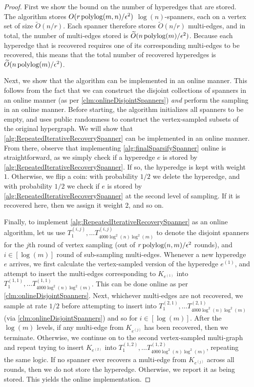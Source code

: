 \documentclass{article}
\begin{document}
\begin{proof}
    First we show the bound on the number of hyperedges that are stored. The algorithm stores $O(r \operatorname{polylog}(m,n) / \epsilon^2)$ $\log(n)$-spanners, each on a vertex set of size $\widetilde{O}(n/r)$. Each spanner therefore stores $\widetilde{O}(n/r)$ multi-edges, and in total, the number of multi-edges stored is $\widetilde{O}(n \operatorname{polylog}(m) / \epsilon^2)$. Because each hyperedge that is recovered requires one of its corresponding multi-edges to be recovered, this means that the total number of recovered hyperedges is $\widetilde{O}(n \operatorname{polylog}(m) / \epsilon^2)$.

    Next, we show that the algorithm can be implemented in an online manner. This follows from the fact that we can construct the disjoint collections of spanners in an online manner (as per \cref{clm:onlineDisjointSpanners}) \emph{and} perform the sampling in an online manner. Before starting, the algorithm initializes all spanners to be empty, and uses public randomness to construct the vertex-sampled subsets of the original hypergraph. We will show that \cref{alg:RepeatedIterativeRecoverySpanner} can be implemented in an online manner. From there, observe that implementing \cref{alg:finalSparsifySpanner} online is straightforward, as we simply check if a hyperedge $e$ is stored by \cref{alg:RepeatedIterativeRecoverySpanner}. If so, the hyperedge is kept with weight $1$. Otherwise, we flip a coin: with probability $1/2$ we delete the hyperedge, and with probability $1/2$ we check if $e$ is stored by \cref{alg:RepeatedIterativeRecoverySpanner} at the second level of sampling. If it is recovered here, then we assign it weight $2$, and so on. 

    Finally, to implement \cref{alg:RepeatedIterativeRecoverySpanner} as an online algorithm, let us use $T^{(i,j)}_1, \dots T^{(i,j)}_{4000 \log^2(n)\log^2(m)}$ to denote the disjoint spanners for the $j$th round of vertex sampling (out of $r \operatorname{polylog}(n,m)/ \epsilon^2$ rounds), and $i \in [\log(m)]$ round of sub-sampling multi-edges. Whenever a new hyperedge $e$ arrives, we first calculate the vertex-sampled version of the hyperedge $e^{(1)}$, and attempt to insert the multi-edges corresponding to $K_{e^{(1)}}$ into $T^{(1,1)}_1, \dots T^{(1,1)}_{4000 \log^2(n)\log^2(m)}$. This can be done online as per \cref{clm:onlineDisjointSpanners}. Next, whichever multi-edges are not recovered, we sample at rate $1/2$ before attempting to insert into $T^{(2,1)}_1, \dots T^{(2,1)}_{4000 \log^2(n)\log^2(m)}$ (via \cref{clm:onlineDisjointSpanners}) and so for $i \in [\log(m)]$. After the $\log(m)$ levels, if any multi-edge from $K_{e^{(j)}}$ has been recovered, then we terminate. Otherwise, we continue on to the second vertex-sampled multi-graph and repeat trying to insert $K_{e^{(2)}}$ into $T^{(1,2)}_1, \dots T^{(1,2)}_{4000 \log^2(n)\log^2(m)}$, repeating the same logic. If no spanner ever recovers a multi-edge from $K_{e^{(j)}}$ across all rounds, then we do not store the hyperedge. Otherwise, we report it as being stored. This yields the online implementation. 
\end{proof}
\end{document}
